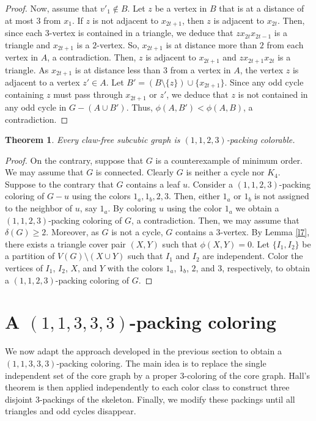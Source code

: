 \documentclass[12pt, oneside]{scrartcl}
\newtheorem{theorem}{Theorem}%
\begin{document}
\begin{proof}
Now, assume that $v'_1\notin B$. Let $z$ be a vertex in $B$ that is at a distance of at most $3$ from $x_1$. If $z$ is not adjacent to $x_{2t+1}$, then $z$ is adjacent to $x_{2t}$. Then, since each $3$-vertex is contained in a triangle, we deduce that $zx_{2t}x_{2t-1}$ is a triangle and $x_{2t+1}$ is a $2$-vertex. So, $x_{2t+1}$ is at distance more than $2$ from each vertex in $A$, a contradiction. Then, $z$ is adjacent to $x_{2t+1}$ and $zx_{2t+1}x_{2t}$ is a triangle. As $x_{2t+1}$ is at distance less than $3$ from a vertex in $A$, the vertex $z$ is adjacent to a vertex $z'\in A$. Let $B'=(B\setminus \{z\})\cup \{x_{2t+1}\}$. Since any odd cycle containing $z$ must pass through $x_{2t+1}$ or $z'$, we deduce that $z$ is not contained in any odd cycle in $G-(A\cup B')$. Thus, $\phi(A,B')<\phi(A,B)$, a contradiction.
\end{proof}  

\begin{theorem}\label{t3}
    Every claw-free subcubic graph is $(1,1,2,3)$-packing colorable.
\end{theorem}
\begin{proof}
    On the contrary, suppose that $G$ is a counterexample of minimum order. We may assume that $G$ is connected. Clearly $G$ is neither a cycle nor $K_4$. Suppose to the contrary that $G$ contains a leaf $u$. Consider a $(1,1,2,3)$-packing coloring of $G-u$ using the colors $1_a,1_b,2,3$. Then, either $1_a$ or $1_b$ is not assigned to the neighbor of $u$, say $1_a$. By coloring $u$ using the color $1_a$ we obtain a $(1,1,2,3)$-packing coloring of $G$, a contradiction. Then, we may assume that $\delta(G)\geq 2$. Moreover, as $G$ is not a cycle, $G$ contains a $3$-vertex. By Lemma \ref{l7}, there exists a triangle cover pair $(X,Y)$ such that $\phi(X,Y)=0$. Let $\{I_1,I_2\}$ be a partition of $V(G)\setminus (X\cup Y)$ such that $I_1$ and $I_2$ are independent. Color the vertices of $I_1$, $I_2$, $X$, and $Y$ with the colors $1_a$, $1_b$, $2$, and $3$, respectively, to obtain a $(1,1,2,3)$-packing coloring of $G$.
\end{proof}


\section{A $(1,1,3,3,3)$-packing coloring}
We now adapt the approach developed in the previous section to obtain a $(1,1,3,3,3)$-packing coloring. The main idea is to replace the single independent set of the core graph by a proper $3$-coloring of the core graph. Hall’s theorem is then applied independently to each color class to construct three disjoint $3$-packings of the skeleton. Finally, we modify these packings until all triangles and odd cycles disappear.
\end{document}
